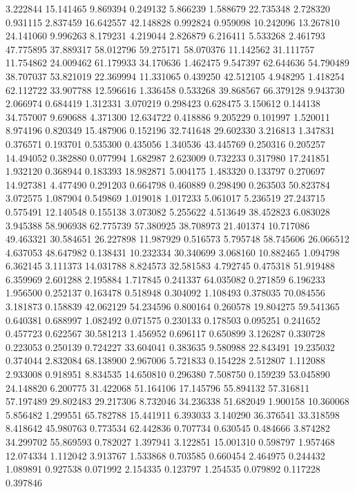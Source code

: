 3.222844
15.141465
9.869394
0.249132
5.866239
1.588679
22.735348
2.728320
0.931115
2.837459
16.642557
42.148828
0.992824
0.959098
10.242096
13.267810
24.141060
9.996263
8.179231
4.219044
2.826879
6.216411
5.533268
2.461793
47.775895
37.889317
58.012796
59.275171
58.070376
11.142562
31.111757
11.754862
24.009462
61.179933
34.170636
1.462475
9.547397
62.644636
54.790489
38.707037
53.821019
22.369994
11.331065
0.439250
42.512105
4.948295
1.418254
62.112722
33.907788
12.596616
1.336458
0.533268
39.868567
66.379128
9.943730
2.066974
0.684419
1.312331
3.070219
0.298423
0.628475
3.150612
0.144138
34.757007
9.690688
4.371300
12.634722
0.418886
9.205229
0.101997
1.520011
8.974196
0.820349
15.487906
0.152196
32.741648
29.602330
3.216813
1.347831
0.376571
0.193701
0.535300
0.435056
1.340536
43.445769
0.250316
0.205257
14.494052
0.382880
0.077994
1.682987
2.623009
0.732233
0.317980
17.241851
1.932120
0.368944
0.183393
18.982871
5.004175
1.483320
0.133797
0.270697
14.927381
4.477490
0.291203
0.664798
0.460889
0.298490
0.263503
50.823784
3.072575
1.087904
0.549869
1.019018
1.017233
5.061017
5.236519
27.243715
0.575491
12.140548
0.155138
3.073082
5.255622
4.513649
38.452823
6.083028
3.945388
58.906938
62.775739
57.380925
38.708973
21.401374
10.717086
49.463321
30.584651
26.227898
11.987929
0.516573
5.795748
58.745606
26.066512
4.637053
48.647982
0.138431
10.232334
30.340699
3.068160
10.882465
1.094798
6.362145
3.111373
14.031788
8.824573
32.581583
4.792745
0.475318
51.919488
6.359969
2.601288
2.195884
1.717845
0.241337
64.035082
0.271859
6.196233
1.956500
0.252137
0.163478
0.518948
0.304092
1.108493
0.378035
70.084556
3.181873
0.158839
42.062129
54.234596
0.800164
0.260578
19.804275
59.541365
0.640381
0.688997
1.082492
0.071575
0.230133
0.178503
0.095251
0.241652
0.457723
0.622567
30.581213
1.456952
0.696117
0.650899
3.126287
0.330728
0.223053
0.250139
0.724227
33.604041
0.383635
9.580988
22.843491
19.235032
0.374044
2.832084
68.138900
2.967006
5.721833
0.154228
2.512807
1.112088
2.933008
0.918951
8.834535
14.650810
0.296380
7.508750
0.159239
53.045890
24.148820
6.200775
31.422068
51.164106
17.145796
55.894132
57.316811
57.197489
29.802483
29.217306
8.732046
34.236338
51.682049
1.900158
10.360068
5.856482
1.299551
65.782788
15.441911
6.393033
3.140290
36.376541
33.318598
8.418642
45.980763
0.773534
62.442836
0.707734
0.630545
0.484666
3.874282
34.299702
55.869593
0.782027
1.397941
3.122851
15.001310
0.598797
1.957468
12.074334
1.112042
3.913767
1.533868
0.703585
0.660454
2.464975
0.244432
1.089891
0.927538
0.071992
2.154335
0.123797
1.254535
0.079892
0.117228
0.397846
